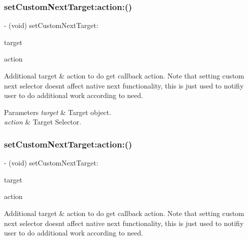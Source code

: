 \subsubsection{\texorpdfstring{set\+Custom\+Next\+Target\+:action\+:()}{setCustomNextTarget:action:()}\hspace{0.1cm}{\footnotesize\ttfamily [2/3]}}
{\footnotesize\ttfamily -\/ (void) set\+Custom\+Next\+Target\+: \begin{DoxyParamCaption}\item[{(nullable id)}]{target }\item[{action:(nullable S\+EL)}]{action }\end{DoxyParamCaption}}

Additional target \& action to do get callback action. Note that setting custom {\ttfamily next} selector doesn\textquotesingle{}t affect native {\ttfamily next} functionality, this is just used to notifiy user to do additional work according to need.


\begin{DoxyParams}{Parameters}
{\em target} & Target object. \\
\hline
{\em action} & Target Selector. \\
\hline
\end{DoxyParams}
\mbox{\label{category_u_i_view_07_i_q_toolbar_addition_08_a37641999d83dba30e056e0fc815d0c98}} 
\subsubsection{\texorpdfstring{set\+Custom\+Next\+Target\+:action\+:()}{setCustomNextTarget:action:()}\hspace{0.1cm}{\footnotesize\ttfamily [3/3]}}
{\footnotesize\ttfamily -\/ (void) set\+Custom\+Next\+Target\+: \begin{DoxyParamCaption}\item[{(nullable id)}]{target }\item[{action:(nullable S\+EL)}]{action }\end{DoxyParamCaption}}

Additional target \& action to do get callback action. Note that setting custom {\ttfamily next} selector doesn\textquotesingle{}t affect native {\ttfamily next} functionality, this is just used to notifiy user to do additional work according to need.


